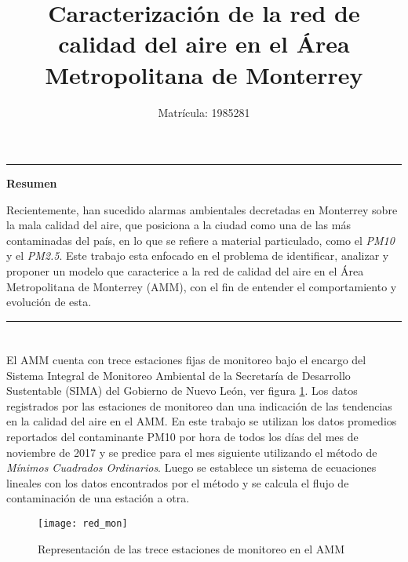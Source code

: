 \documentclass[a4paper, 11pt]{article}
\begin{document}
\title{Caracterización de la red de calidad del aire en el Área Metropolitana de Monterrey}
\author{Matr\'icula: 1985281}
\date{ }
\maketitle

\vspace{-1 cm}
\begin{center}\rule{\textwidth}{0.1mm} \end{center}
\vspace{-1.3 cm}
\begin {center}
\item \Large{\textbf{ Resumen}}
\end {center}

Recientemente, han sucedido alarmas ambientales decretadas en Monterrey sobre la mala calidad del aire, que posiciona a la ciudad como una de las más contaminadas del país, en lo que se refiere a material particulado, como el \textit{PM10} y el \textit{PM2.5}. Este trabajo esta enfocado en el problema de identificar, analizar y proponer un modelo que caracterice a la red de calidad del aire en el Área Metropolitana de Monterrey (AMM), con el fin de entender el comportamiento y evolución de esta. 

\vspace{-0.5cm}
\begin{center}\rule{\textwidth}{0.1mm} \end{center}




\section*{}
El AMM cuenta con trece estaciones fijas de monitoreo bajo el encargo del Sistema Integral de Monitoreo Ambiental de la Secretaría de Desarrollo Sustentable  (SIMA) del Gobierno de Nuevo León, ver figura \ref{figure1}.  Los datos registrados por las estaciones de monitoreo dan una indicación de las tendencias en la calidad del aire en el AMM. En este trabajo se utilizan los datos promedios reportados del contaminante PM10 por hora de todos los días del mes de noviembre de 2017 y se predice para el mes siguiente utilizando el método de \textit{Mínimos Cuadrados Ordinarios}. Luego se establece un sistema de ecuaciones lineales con los datos encontrados por el método y se calcula el flujo de contaminación de una estación a otra.

\begin{figure}[H]
\centering
\texttt{[image: red\_mon]}
\caption{Representación de las trece estaciones de monitoreo en el AMM}
\label{figure1}
\end{figure}
\end{document}
